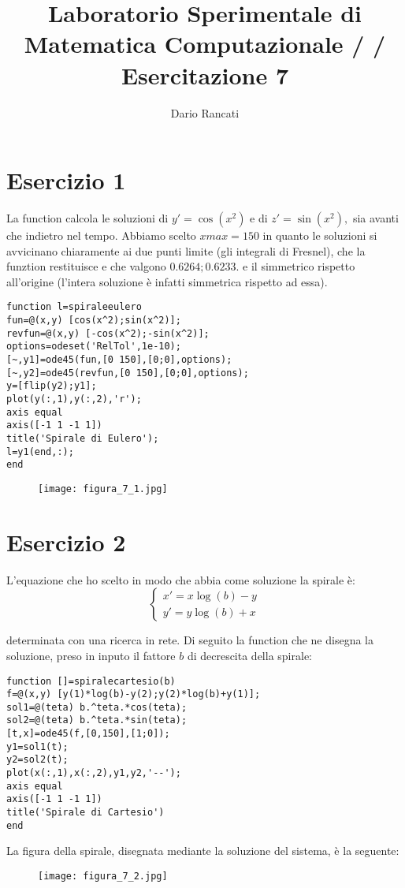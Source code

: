 \documentclass{article}
\title{\textbf{Laboratorio Sperimentale di Matematica Computazionale / / Esercitazione 7}}
\author{Dario Rancati}
\begin{document}
\section*{Esercizio 1}
La function calcola le soluzioni di $y'=\cos(x^2)$ e di $z'=\sin(x^2),$ sia avanti che indietro nel tempo. Abbiamo scelto $xmax = 150$ in quanto le soluzioni si avvicinano chiaramente ai due punti limite (gli integrali di Fresnel), che la funztion restituisce e che valgono $0.6264;0.6233.$ e il simmetrico rispetto all'origine (l'intera soluzione è infatti simmetrica rispetto ad essa).
\begin{lstlisting}
function l=spiraleeulero
fun=@(x,y) [cos(x^2);sin(x^2)];
revfun=@(x,y) [-cos(x^2);-sin(x^2)];
options=odeset('RelTol',1e-10);
[~,y1]=ode45(fun,[0 150],[0;0],options);
[~,y2]=ode45(revfun,[0 150],[0;0],options);
y=[flip(y2);y1];
plot(y(:,1),y(:,2),'r');
axis equal
axis([-1 1 -1 1])
title('Spirale di Eulero');
l=y1(end,:);
end
\end{lstlisting}

\begin{figure}[!h]
\centering
\texttt{[image: figura\_7\_1.jpg]}
\end{figure}

\section*{Esercizio 2}
L'equazione che ho scelto in modo che abbia come soluzione la spirale è: 
\begin{equation}
\begin{cases}
x'=x\log(b)-y \\ y'=y\log(b)+x 
\end{cases}
\end{equation}

determinata con una ricerca in rete. Di seguito la function che ne disegna la soluzione, preso in inputo il fattore $b$ di decrescita della spirale:

\begin{lstlisting}
function []=spiralecartesio(b)
f=@(x,y) [y(1)*log(b)-y(2);y(2)*log(b)+y(1)];
sol1=@(teta) b.^teta.*cos(teta);
sol2=@(teta) b.^teta.*sin(teta);
[t,x]=ode45(f,[0,150],[1;0]);
y1=sol1(t);
y2=sol2(t);
plot(x(:,1),x(:,2),y1,y2,'--');
axis equal
axis([-1 1 -1 1])
title('Spirale di Cartesio')
end
\end{lstlisting}

La figura della spirale, disegnata mediante la soluzione del sistema, è la seguente:

\begin{figure}[!h]
\centering
\texttt{[image: figura\_7\_2.jpg]}
\end{figure}
\end{document}
